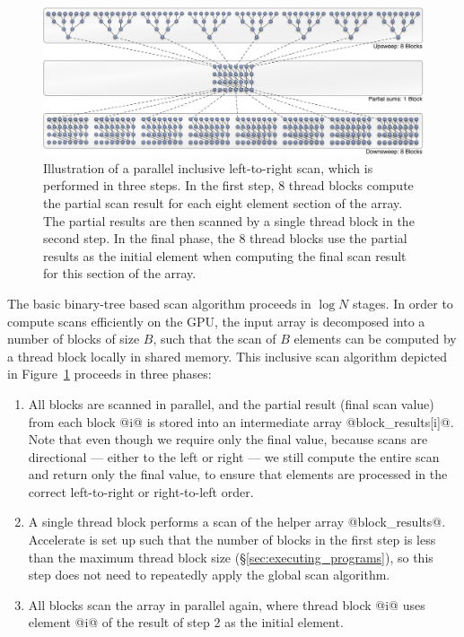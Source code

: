 \begin{figure}
    \begin{center}
        \includegraphics[width=\textwidth]{images/sec-4/scan}
    \end{center}
    \caption[A parallel inclusive scan]{Illustration of a parallel inclusive
        left-to-right scan, which is performed in three steps. In the first
        step, 8 thread blocks compute the partial scan result for each eight
        element section of the array. The partial results are then scanned by a
        single thread block in the second step. In the final phase, the 8 thread
        blocks use the partial results as the initial element when computing the
        final scan result for this section of the array.}
    \label{fig:fast_scan}
\end{figure}

The basic binary-tree based scan algorithm proceeds in $\log N$ stages.
In order to compute scans efficiently on the GPU, the input array is decomposed
into a number of blocks of size $B$, such that the scan of $B$ elements can be
computed by a thread block locally in shared memory. This inclusive scan
algorithm depicted in Figure~\ref{fig:fast_scan} proceeds in three phases:
%
\begin{enumerate}
\item All blocks are scanned in parallel, and the partial result (final scan
    value) from each block @i@ is stored into an intermediate array
    @block_results[i]@. Note that even though we require only the final value,
    because scans are directional --- either to the left or right --- we still
    compute the entire scan and return only the final value, to ensure that
    elements are processed in the correct left-to-right or right-to-left order.

\item A single thread block performs a scan of the helper array @block_results@.
    Accelerate is set up such that the number of blocks in the first step is
    less than the maximum thread block size (\S\ref{sec:executing_programs}), so
    this step does not need to repeatedly apply the global scan algorithm.

\item All blocks scan the array in parallel again, where thread block @i@ uses
    element @i@ of the result of step 2 as the initial element.

\end{enumerate}


